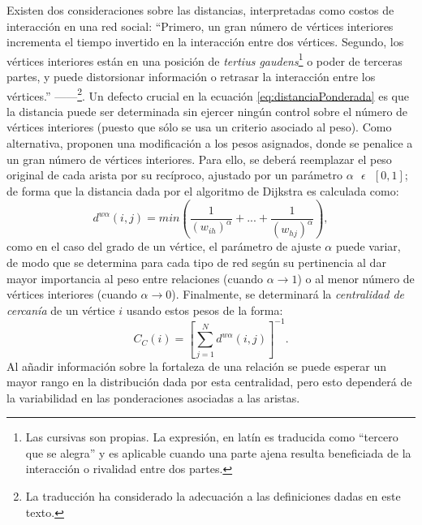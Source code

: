 \documentclass[letterpaper, 11pt]{book}
\theoremstyle{definition}
\theoremstyle{remark}
\begin{document}
Existen dos consideraciones sobre las distancias, interpretadas como costos de interacción en una red social: ``Primero, un gran número de vértices interiores incrementa el tiempo invertido en la interacción entre dos vértices. Segundo, los vértices interiores están en una posición de \emph{tertius gaudens}\footnote{Las cursivas son propias. La expresión, en latín es traducida como ``tercero que se alegra'' y es aplicable cuando una parte ajena resulta beneficiada de la interacción o rivalidad entre dos partes.} o poder de terceras partes, y puede distorsionar información o retrasar la interacción entre los vértices.'' ---\citet{2010_Opsahl_NodeCentralityWeighted}---\footnote{
    La traducción ha considerado la adecuación a las definiciones dadas en este texto.
}. 
Un defecto crucial en la ecuación \ref{eq:distanciaPonderada} es que la distancia puede ser determinada sin ejercer ningún control sobre el número de vértices interiores (puesto que sólo se usa un criterio asociado al peso). 
Como alternativa, \citet{2010_Opsahl_NodeCentralityWeighted} proponen una modificación a los pesos asignados, donde se penalice a un gran número de vértices interiores. 
Para ello, se deberá reemplazar el peso original de cada arista por su recíproco, ajustado por un parámetro $\alpha \text{ } \epsilon \text{ } [0,1] $; de forma que la distancia dada por el algoritmo de Dijkstra es calculada como:
\begin{equation}\label{eq:distanciaAjustada}
    d^{w \alpha}(i,j) = min\left( \frac{1}{(w_{ih})^{\alpha}}+...+ \frac{1}{(w_{hj})^{\alpha}} \right),
\end{equation}
como en el caso del grado de un vértice, el parámetro de ajuste $\alpha$ puede variar, de modo que se determina para cada tipo de red según su pertinencia al dar mayor importancia al peso entre relaciones (cuando $\alpha \rightarrow 1$) o al menor número de vértices interiores (cuando $\alpha \rightarrow 0$). 
Finalmente, se determinará la \emph{centralidad de cercanía} de un vértice $i$ usando estos pesos de la forma:
\begin{equation}\label{eq:cercaniaAjustada}
    C_{C}(i) = \left[ \sum_{j=1}^{N} d^{w \alpha}(i,j) \right]^{-1}.
\end{equation}
Al añadir información sobre la fortaleza de una relación se puede esperar un mayor rango en la distribución dada por esta centralidad, pero esto dependerá de la variabilidad en las ponderaciones asociadas a las aristas. 
\end{document}
